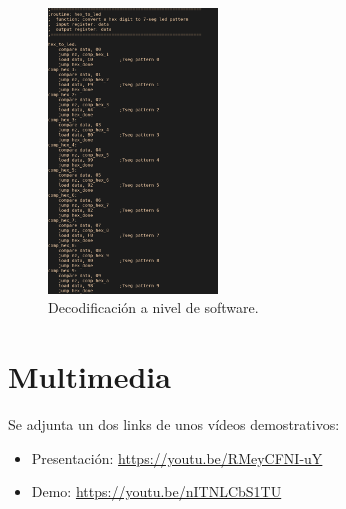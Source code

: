 \documentclass[11pt, a4paper]{article}
\begin{document}
		\begin{figure}[H]
			\centering
			\includegraphics[width=0.4\textwidth]{Imagenes/sseg.png}
			\caption{Decodificación a nivel de software.}
			\label{fig:isr}
		\end{figure} 

\section{Multimedia}
		Se adjunta un dos links de unos vídeos demostrativos: 
		\begin{itemize}
			\item Presentación: \url{https://youtu.be/RMeyCFNI-uY}
			\item Demo: \url{https://youtu.be/nITNLCbS1TU}
		\end{itemize}
\end{document}
